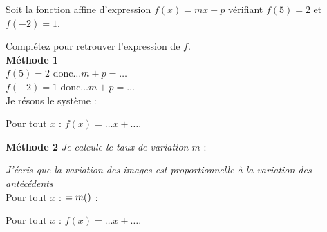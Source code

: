 \documentclass[main.tex]{subfiles}
\begin{document}
\begin{exercise} Soit la fonction affine d'expression $f(x)=mx+p$ vérifiant $f(5)=2$ et $f(-2)=1$.\\ 
\noindent
\parbox{0.48\linewidth}{
Complétez pour retrouver l'expression de $f$.\\
\textbf{Méthode 1} \\
$f(5)=2$ donc\hfill $\ldots m + p = \ldots$\\
$f(-2)=1$ donc\hfill  $\ldots m + p = \ldots$\\
Je résous le système :\

\vspace{11.5em}

Pour tout $x$ : $f(x)=\ldots x + \ldots$.
}
\hfill
\parbox{0.48\linewidth}{
\textbf{Méthode 2}
\emph{Je calcule le taux de variation $m$} :\\
\vspace{4em}


\emph{J'écris que la variation des images est proportionnelle à la variation des antécédents}\\
Pour tout $x$ : $\dotfill = m (\dotfill) $ :\\ 
\vspace{5.5em} 

Pour tout $x$ : $f(x)=\ldots x + \ldots$.
} 
\end{exercise}
\end{document}
